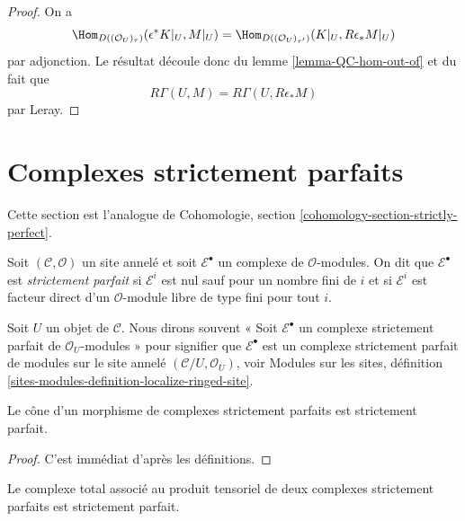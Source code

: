 \begin{proof}
On a
$$
\Hom_{D((\mathcal{O}_U)_\tau)}(\epsilon^*K|_U, M|_U) =
\Hom_{D((\mathcal{O}_U)_{\tau'})}(K|_U, R\epsilon_*M|_U)
$$
par adjonction. Le résultat découle donc du lemme
\ref{lemma-QC-hom-out-of} et du fait que
$$
R\Gamma(U, M) = R\Gamma(U, R\epsilon_*M)
$$
par Leray.
\end{proof}







\section{Complexes strictement parfaits}
\label{section-strictly-perfect}

\noindent
Cette section est l'analogue de Cohomologie, section
\ref{cohomology-section-strictly-perfect}.

\begin{definition}
\label{definition-strictly-perfect}
Soit $(\mathcal{C}, \mathcal{O})$ un site annelé et soit
$\mathcal{E}^\bullet$ un complexe de $\mathcal{O}$-modules. On dit que
$\mathcal{E}^\bullet$ est {\it strictement parfait} si
$\mathcal{E}^i$ est nul sauf pour un nombre fini de $i$ et si
$\mathcal{E}^i$ est facteur direct d'un $\mathcal{O}$-module libre de type fini
pour tout $i$.
\end{definition}

\noindent
Soit $U$ un objet de $\mathcal{C}$. Nous dirons souvent « Soit
$\mathcal{E}^\bullet$ un complexe strictement parfait de
$\mathcal{O}_U$-modules » pour signifier que $\mathcal{E}^\bullet$ est un
complexe strictement parfait de modules sur le site annelé
$(\mathcal{C}/U, \mathcal{O}_U)$, voir Modules sur les sites, définition
\ref{sites-modules-definition-localize-ringed-site}.

\begin{lemma}
\label{lemma-cone}
Le cône d'un morphisme de complexes strictement parfaits est strictement
parfait.
\end{lemma}

\begin{proof}
C'est immédiat d'après les définitions.
\end{proof}

\begin{lemma}
\label{lemma-tensor}
Le complexe total associé au produit tensoriel de deux complexes strictement
parfaits est strictement parfait.
\end{lemma}

